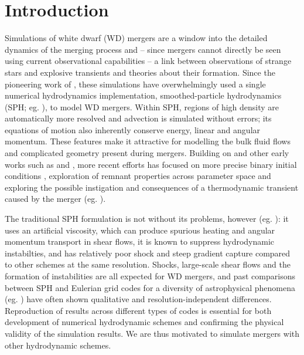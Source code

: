 \section{Introduction}
\label{sec:c3_intro}


Simulations of white dwarf (WD) mergers are a window into the detailed dynamics of the merging process and -- since mergers cannot directly be seen using current observational capabilities -- a link between observations of strange stars and explosive transients and theories about their formation.  Since the pioneering work of \cite{benz+90}, these simulations have overwhelmingly used a single numerical hydrodynamics implementation, smoothed-particle hydrodynamics (SPH; eg. \citealt{mona05, spri10rev}), to model WD mergers.  Within SPH, regions of high density are automatically more resolved and advection is simulated without errors; its equations of motion also inherently conserve energy, linear and angular momentum.  These features make it attractive for modelling the bulk fluid flows and complicated geometry present during mergers.  Building on \citeauthor{benz+90} and other early works such as \cite{segrcm97} and \cite{guerig04}, more recent efforts has focused on more precise binary initial conditions \citep{dan+11}, exploration of remnant properties across parameter space \citep{loreig09, rask+12, zhu+13, dan+14} and exploring the possible instigation and consequences of a thermodynamic transient caused by the merger (eg. \citealt{pakm+10, dan+12, pakm+13, moll+14, rask+14}).

The traditional SPH formulation is not without its problems, however (eg. \citealt{spri10,hopk15}): it uses an artificial viscosity, which can produce spurious heating and angular momentum transport in shear flows, it is known to suppress hydrodynamic instabilties, and has relatively poor shock and steep gradient capture compared to other schemes at the same resolution.  Shocks, large-scale shear flows and the formation of instabilities are all expected for WD mergers, and past comparisons between SPH and Eulerian grid codes for a diversity of astrophysical phenomena (eg. \citealt{dval+06, tracsp07, mitc+09}) have often shown qualitative and resolution-independent differences.  Reproduction of results across different types of codes is essential for both development of numerical hydrodynamic schemes and confirming the physical validity of the simulation results.  We are thus motivated to simulate mergers with other hydrodynamic schemes.

